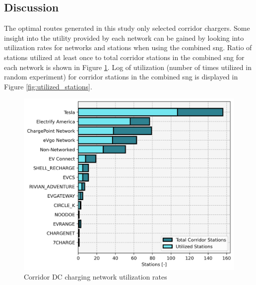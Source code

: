 \begin{multicols}{2}
	
\section*{Discussion}

The optimal routes generated in this study only selected corridor chargers. Some insight into the utility provided by each network can be gained by looking into utilization rates for networks and stations when using the combined \gls{sng}. Ratio of stations utilized at least once to total corridor stations in the combined \gls{sng} for each network is shown in Figure \ref{fig:utilization_rates}. Log of utilization (number of times utilized in random experiment) for corridor stations in the combined \gls{sng} is displayed in Figure \ref{fig:utilized_stations}.

\begin{figure}[H]
	\centering
	\includegraphics[width = \linewidth]{figs/corridor_station_utilization.png}
	\caption{Corridor DC charging network utilization rates}
	\label{fig:utilization_rates}
\end{figure}


\end{multicols}
